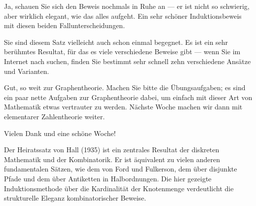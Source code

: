 \begin{spoken-clean}[01:24:49 - 01:26:33]
Ja, schauen Sie sich den Beweis nochmals in Ruhe an --- er ist nicht so schwierig, aber wirklich elegant, wie das alles aufgeht. Ein sehr schöner Induktionsbeweis mit diesen beiden Fallunterscheidungen.

Sie sind diesem Satz vielleicht auch schon einmal begegnet. Es ist ein sehr berühmtes Resultat, für das es viele verschiedene Beweise gibt --- wenn Sie im Internet nach  suchen, finden Sie bestimmt sehr schnell zehn verschiedene Ansätze und Varianten.

Gut, so weit zur Graphentheorie. Machen Sie bitte die Übungsaufgaben; es sind ein paar nette Aufgaben zur Graphentheorie dabei, um einfach mit dieser Art von Mathematik etwas vertrauter zu werden. Nächste Woche machen wir dann mit elementarer Zahlentheorie weiter.

Vielen Dank und eine schöne Woche!
\end{spoken-clean}

\begin{didactic-insight}
Der Heiratssatz von Hall (1935) ist ein zentrales Resultat der diskreten Mathematik und der Kombinatorik. Er ist äquivalent zu vielen anderen fundamentalen Sätzen, wie dem  von Ford und Fulkerson, dem  über disjunkte Pfade und dem  über Antiketten in Halbordnungen. Die hier gezeigte Induktionsmethode über die Kardinalität der Knotenmenge verdeutlicht die strukturelle Eleganz kombinatorischer Beweise.
\end{didactic-insight}

